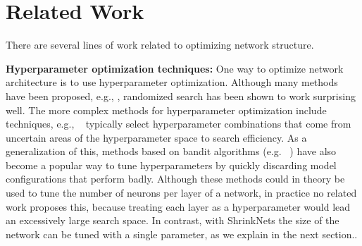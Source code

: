 \section{Related Work}


There are several lines of work related to optimizing network structure. 


\noindent\textbf{Hyperparameter optimization techniques: }
One way to optimize network architecture is to use 
hyperparameter optimization.  Although many methods have been 
proposed, e.g., \cite{BergstraJAMESBERGSTRA2012,Snoek12},
randomized search has been shown to work surprising well.
The more complex methods for
hyperparameter optimization include techniques, e.g., ~\cite{Snoek12} typically
 select hyperparameter combinations that come from uncertain areas of the
hyperparameter space to search efficiency. 
As a generalization of this,  methods based on bandit algorithms (e.g.
~\cite{li2016hyperband, jamieson2016}) have also become a popular way to tune
hyperparameters by quickly discarding 
model configurations that perform badly. 
Although these methods could in theory be used to tune the number of neurons per layer
of a network, in practice no related work proposes this, because treating each layer as a hyperparameter
would lead an excessively large search space.
In contrast, with ShrinkNets the size of the network can be tuned with 
a single parameter, as we explain in the next section..

